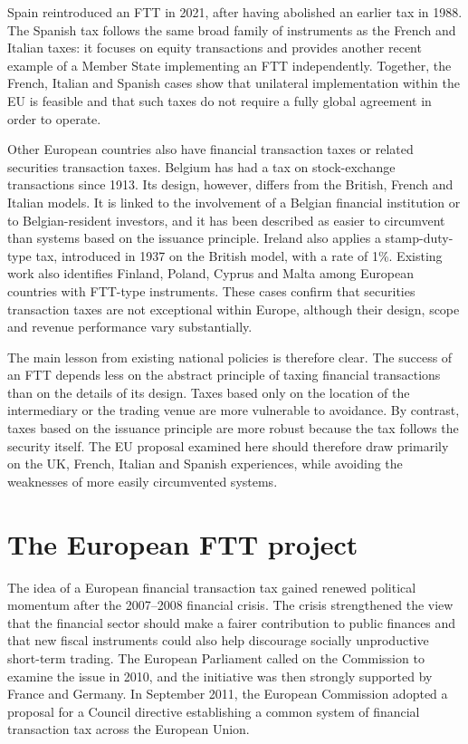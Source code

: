 \documentclass[../main]{subfiles}
\begin{document}
Spain reintroduced an FTT in 2021, after having abolished an earlier tax in 1988. The Spanish tax follows the same broad family of instruments as the French and Italian taxes: it focuses on equity transactions and provides another recent example of a Member State implementing an FTT independently. Together, the French, Italian and Spanish cases show that unilateral implementation within the EU is feasible and that such taxes do not require a fully global agreement in order to operate.

Other European countries also have financial transaction taxes or related securities transaction taxes. Belgium has had a tax on stock-exchange transactions since 1913. Its design, however, differs from the British, French and Italian models. It is linked to the involvement of a Belgian financial institution or to Belgian-resident investors, and it has been described as easier to circumvent than systems based on the issuance principle. Ireland also applies a stamp-duty-type tax, introduced in 1937 on the British model, with a rate of 1\%. Existing work also identifies Finland, Poland, Cyprus and Malta among European countries with FTT-type instruments. These cases confirm that securities transaction taxes are not exceptional within Europe, although their design, scope and revenue performance vary substantially.

The main lesson from existing national policies is therefore clear. The success of an FTT depends less on the abstract principle of taxing financial transactions than on the details of its design. Taxes based only on the location of the intermediary or the trading venue are more vulnerable to avoidance. By contrast, taxes based on the issuance principle are more robust because the tax follows the security itself. The EU proposal examined here should therefore draw primarily on the UK, French, Italian and Spanish experiences, while avoiding the weaknesses of more easily circumvented systems.

\section{The European FTT project}

The idea of a European financial transaction tax gained renewed political momentum after the 2007--2008 financial crisis. The crisis strengthened the view that the financial sector should make a fairer contribution to public finances and that new fiscal instruments could also help discourage socially unproductive short-term trading. The European Parliament called on the Commission to examine the issue in 2010, and the initiative was then strongly supported by France and Germany. In September 2011, the European Commission adopted a proposal for a Council directive establishing a common system of financial transaction tax across the European Union.
\end{document}
